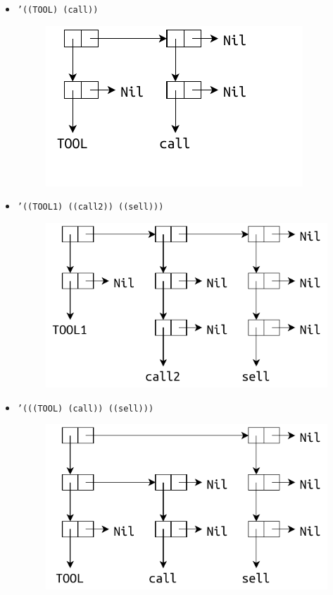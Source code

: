 \begin{itemize}[$\bullet$]
	\clearpage
	
	\item \texttt{'((TOOL) (call))}
	
	\begin{figure}[ht]
		\centering
		\includegraphics[scale=1.2]{img/1-4}
	\end{figure}
	
	\item \texttt{'((TOOL1) ((call2)) ((sell)))}
	
	\begin{figure}[ht]
		\centering
		\includegraphics[scale=1]{img/1-5}
	\end{figure}
	
	\item \texttt{'(((TOOL) (call)) ((sell)))}
	
	\begin{figure}[ht]
		\centering
		\includegraphics[scale=1]{img/1-6}
	\end{figure}
\end{itemize}

